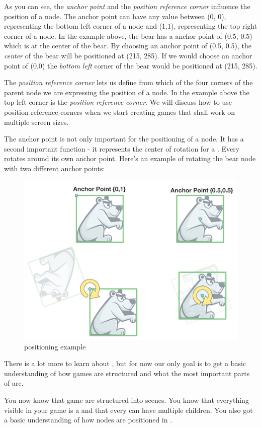 As you can see, the \textit{anchor point} and the \textit{position reference
corner} influence the position of a node. The anchor point can have any value
between (0, 0), representing the bottom left corner of a node and (1,1),
representing the top right corner of a node. In the example above, the bear has
a anchor point of (0.5, 0.5) which is at the center of the bear. By choosing an
anchor point of (0.5, 0.5), the \textit{center} of the bear will be positioned
at (215, 285). If we would choose an anchor point of (0,0) the \textit{bottom
left} corner of the bear would be positioned at (215, 285).

The \textit{position reference
corner} lets us define from which of the four corners of the parent node we are
expressing the position of a node. In the example above the top left corner is
the \textit{position reference corner}. We will discuss how to use position reference corners when we start 
creating games that shall work on multiple screen sizes.

The anchor point is not only important for the positioning of a node. It has a
second important function - it represents the center of rotation for a
\ccnode{}. Every \ccnode{} rotates around its own anchor point. Here's an
example of rotating the bear node with two different anchor points:

\begin{figure}[H]
		\centering
		\includegraphics[width=0.6\linewidth]{images/cocos2d/ccnode/Rotation.png}     
		\caption{\ccnode{} positioning example}
\end{figure}

There is a lot more to learn about \ccnode{}, but for now our only goal is to
get a basic understanding of how \cocos{} games are structured and what the most
important parts of \cocos{} are.

You now know that \cocos{} game are structured into scenes. You know that
everything visible in your game is a \ccnode{} and that every \ccnode{} can have
multiple children. You also got a basic understanding of how nodes are
positioned in \cocos{}.

